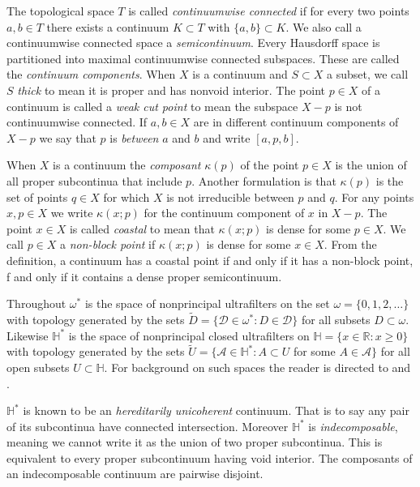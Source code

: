 \documentclass[12pt]{article}
\theoremstyle{plain}
\theoremstyle{definition}
\newcommand{\K}{\ensuremath{\kappa}}
\newcommand{\W}{\ensuremath{\omega}}
\newcommand{\RR}{\ensuremath{\mathbb R}}
\newcommand{\HH}{\ensuremath{\mathbb H}}
\newcommand{\0}{\ensuremath{\varnothing}}
\newcommand{\cD}{\ensuremath{\mathcal D}}
\newcommand{\cA}{\ensuremath{\mathcal A}}
\newcommand{\cE}{\ensuremath{\mathcal E}}
\begin{document}
	The topological space $T$ is called \textit{continuumwise connected} if for every two points $a,b \in T$ there exists a continuum $K \subset T$ with $\{a,b\} \subset K$. We also call a continuumwise connected space a \textit{semicontinuum}. Every Hausdorff space is partitioned into maximal continuumwise connected subspaces. These are called the \textit{continuum components}. When $X$ is a continuum and $S \subset X$ a subset, we call $S$ \textit{thick} to mean it is proper and has nonvoid interior. 
	The point \mbox{$p \in X$} of a continuum is called a \textit{weak cut point} to mean the subspace $X-p$ is not continuumwise connected. 
	If $a,b \in X$ are in different continuum components of $X-p$ we say that $p$ is \textit{between} $a$ and $b$ and write $[a,p,b]$. 
	
	
	
	When $X$ is a continuum the \textit{composant} $\K(p)$ of the point $p \in X$ is the union of all proper subcontinua that include $p$. 
	Another formulation is that $\K(p)$ is the set of points $q \in X$ for which $X$ is not irreducible between $p$ and $q$. 
	For any points  $x,p \in X$ we write $\K(x;p)$ for the continuum component of $x$ in $X-p$. 
	The point $x \in X$ is called \textit{coastal} to mean that $\K(x;p)$ is dense for some $p \in X$. 
	We call $p \in X$ a \textit{non-block point} if $\K(x;p)$ is dense for some $x \in X$. 
	From the definition, a continuum has a coastal point if and only if it has a non-block point, 
	f and only if it contains a dense proper semicontinuum.
	
	
	Throughout $\W^*$ is the space of nonprincipal ultrafilters on the set $\W = \{0,1,2, \ldots\}$ 
	with topology generated by the sets $\widetilde{D} = \{\cD \in \W^* \colon D \in \cD\}$ for all subsets $D\subset \W$. 
	Likewise $\HH^*$ is the space of nonprincipal closed ultrafilters on $\HH = \{x \in \RR \colon x \ge 0\}$ 
	with topology generated by the sets $\widetilde{U} = \{\cA \in \HH^* \colon A \subset U$ for some $A \in \cA\} $ 
	for all open subsets $U \subset \HH$. 
	For background on such spaces the reader is directed to \cite{CS1} and \cite{CSbook}.
	
	
	$\HH^*$ is known to be an \textit{hereditarily unicoherent} continuum. 
	That is to say any pair of its subcontinua have  connected intersection. 
	Moreover $\HH^*$ is \textit{indecomposable}, meaning we cannot write it as the union of two proper subcontinua. 
	This is equivalent to every proper subcontinuum having void interior. 
	The composants of an indecomposable continuum are pairwise disjoint. 
	
\end{document}

